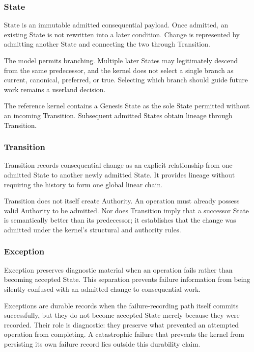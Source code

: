 \documentclass[11pt]{article}
\begin{document}
\subsubsection{State}

State is an immutable admitted consequential payload. Once admitted, an existing State is not rewritten into a later condition. Change is represented by admitting another State and connecting the two through Transition.

The model permits branching. Multiple later States may legitimately descend from the same predecessor, and the kernel does not select a single branch as current, canonical, preferred, or true. Selecting which branch should guide future work remains a userland decision.

The reference kernel contains a Genesis State as the sole State permitted without an incoming Transition. Subsequent admitted States obtain lineage through Transition.

\subsubsection{Transition}

Transition records consequential change as an explicit relationship from one admitted State to another newly admitted State. It provides lineage without requiring the history to form one global linear chain.

Transition does not itself create Authority. An operation must already possess valid Authority to be admitted. Nor does Transition imply that a successor State is semantically better than its predecessor; it establishes that the change was admitted under the kernel's structural and authority rules.

\subsubsection{Exception}

Exception preserves diagnostic material when an operation fails rather than becoming accepted State. This separation prevents failure information from being silently confused with an admitted change to consequential work.

Exceptions are durable records when the failure-recording path itself commits successfully, but they do not become accepted State merely because they were recorded. Their role is diagnostic: they preserve what prevented an attempted operation from completing. A catastrophic failure that prevents the kernel from persisting its own failure record lies outside this durability claim.
\end{document}
